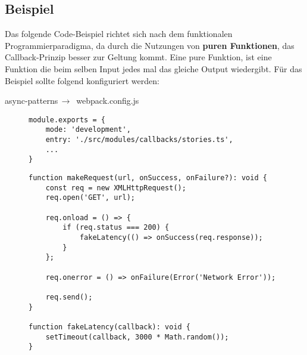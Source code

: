 \subsection{Beispiel}
Das folgende Code-Beispiel richtet sich nach dem funktionalen Programmierparadigma, da durch die Nutzungen von \textbf{puren Funktionen}, das Callback-Prinzip besser zur Geltung kommt. Eine pure Funktion, ist eine Funktion die beim selben Input jedes mal das gleiche Output wiedergibt. Für das Beispiel sollte folgend konfiguriert werden:

\begin{center}
    async-patterns$\,\to\,$ webpack.config.js
\end{center}

\begin{figure}[H]
\begin{lstlisting}[basicstyle=\small]
module.exports = {
    mode: 'development',
    entry: './src/modules/callbacks/stories.ts',
    ...
}
\end{lstlisting}
\end{figure}

\begin{figure}[H]
\begin{lstlisting}[basicstyle=\small]
function makeRequest(url, onSuccess, onFailure?): void {
    const req = new XMLHttpRequest();
    req.open('GET', url);

    req.onload = () => {
        if (req.status === 200) {
            fakeLatency(() => onSuccess(req.response));
        }
    };

    req.onerror = () => onFailure(Error('Network Error'));

    req.send();
}

function fakeLatency(callback): void {
    setTimeout(callback, 3000 * Math.random());
}
\end{lstlisting}
\end{figure}

